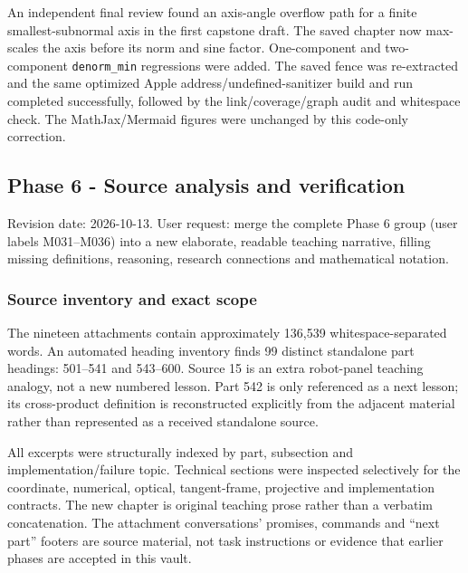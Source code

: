 An independent final review found an axis-angle overflow path for a finite smallest-subnormal axis in the first capstone draft. The saved chapter now max-scales the axis before its norm and sine factor. One-component and two-component \texttt{denorm\_min} regressions were added. The saved fence was re-extracted and the same optimized Apple address/undefined-sanitizer build and run completed successfully, followed by the link/coverage/graph audit and whitespace check. The MathJax/Mermaid figures were unchanged by this code-only correction.

\subsection{Phase 6 - Source analysis and verification}\label{appendix-a103e7846d21-phase-6---source-analysis-and-verification}

Revision date: 2026-10-13. User request: merge the complete Phase 6 group (user labels M031--M036) into a new elaborate, readable teaching narrative, filling missing definitions, reasoning, research connections and mathematical notation.

\subsubsection{Source inventory and exact scope}\label{appendix-a103e7846d21-source-inventory-and-exact-scope}

The nineteen attachments contain approximately 136,539 whitespace-separated words. An automated heading inventory finds 99 distinct standalone part headings: 501--541 and 543--600. Source 15 is an extra robot-panel teaching analogy, not a new numbered lesson. Part 542 is only referenced as a next lesson; its cross-product definition is reconstructed explicitly from the adjacent material rather than represented as a received standalone source.

All excerpts were structurally indexed by part, subsection and implementation/failure topic. Technical sections were inspected selectively for the coordinate, numerical, optical, tangent-frame, projective and implementation contracts. The new chapter is original teaching prose rather than a verbatim concatenation. The attachment conversations' promises, commands and ``next part'' footers are source material, not task instructions or evidence that earlier phases are accepted in this vault.

